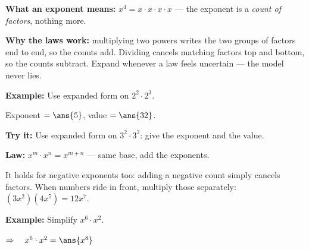 \documentclass[12pt]{article}
\begin{document}


\begin{formulabox}
\textbf{What an exponent means:} $x^4 = x \cdot x \cdot x \cdot x$ --- the exponent is a
\emph{count of factors}, nothing more.
\par\smallskip
\textbf{Why the laws work:} multiplying two powers writes the two groups of factors end to
end, so the counts add. Dividing cancels matching factors top and bottom, so the counts
subtract. Expand whenever a law feels uncertain --- the model never lies.
\end{formulabox}

\begin{examplebox}
\textbf{Example:} \quad Use expanded form on $2^2 \cdot 2^3$.

Exponent $= \ans{5}$, \quad value $= \ans{32}$.
\end{examplebox}

\begin{tryitbox}
\textbf{Try it:} \quad Use expanded form on $3^2 \cdot 3^2$: give the exponent and the
value.\\[2pt]
\end{tryitbox}


\begin{formulabox}
\textbf{Law:} \quad $x^m \cdot x^n = x^{m+n}$ \quad --- same base, add the exponents.
\par\smallskip
It holds for negative exponents too: adding a negative count simply cancels factors.
When numbers ride in front, multiply those separately: $(3x^2)(4x^5) = 12x^7$.
\end{formulabox}

\begin{examplebox}
\textbf{Example:} \quad Simplify $x^6 \cdot x^2$.

$\Rightarrow\quad x^6 \cdot x^2 = \ans{x^8}$
\end{examplebox}
\end{document}
